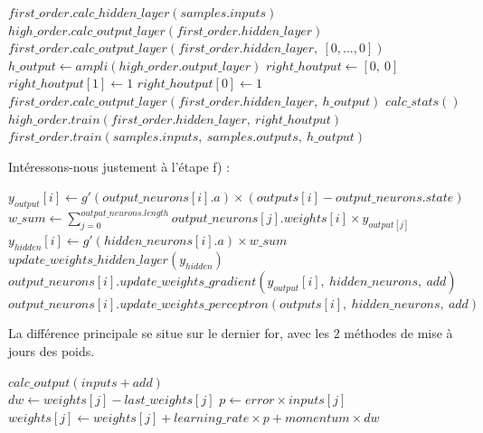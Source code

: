 \documentclass[a4paper,12pt, twoside]{article}
\begin{document}
\begin{algorithmic}

\State $first\_order.calc\_hidden\_layer(samples.inputs)$
\State $high\_order.calc\_output\_layer(first\_order.hidden\_layer)$
\State $first\_order.calc\_output\_layer(first\_order.hidden\_layer,\ [0, ..., 0])$
\State 
\State $h\_output \gets ampli(high\_order.output\_layer)$
\State $right\_houtput \gets [0,\ 0]$
  \State $right\_houtput[1] \gets 1$
\Else
  \State $right\_houtput[0] \gets 1$
\EndIf
\State $first\_order.calc\_output\_layer(first\_order.hidden\_layer,\ h\_output)$
\State
\State $calc\_stats()$
\State
\State $high\_order.train(first\_order.hidden\_layer,\ right\_houtput)$
\State $first\_order.train(samples.inputs,\ samples.outputs,\ h\_output)$
\State
\State
\end{algorithmic}
Intéressons-nous justement à l'étape f) :
\\[0.7cm]

\begin{algorithmic}

\State $y_{output}[i] \gets g'(output\_neurons[i].a) \times ( outputs[i] - output\_neurons.state )$
\EndFor
\\
\State $w\_sum \gets \sum \limits_{j=0}^{output\_neurons.length} output\_neurons[j].weights[i] \times y_{output[j]}$
\State $y_{hidden}[i] \gets g'(hidden\_neurons[i].a) \times w\_sum$
\EndFor
\State $update\_weights\_hidden\_layer(y_{hidden})$
\\
\State $output\_neurons[i].update\_weights\_gradient(y_{output}[i],\ hidden\_neurons,\ add)$
\State $output\_neurons[i].update\_weights\_perceptron(outputs[i],\ hidden\_neurons,\ add)$
\EndFor
\EndFunction
\State
\end{algorithmic}

La différence principale se situe sur le dernier for, avec les 2 méthodes de mise à jours des poids.
\\[0.7cm]

\begin{algorithmic}

\State $calc\_output(inputs + add)$
\\
\State $dw \gets weights[j] - last\_weights[j]$
\State $p \gets error \times inputs[j]$
\State $weights[j] \gets weights[j] + learning\_rate \times p + momentum \times dw$
\EndFor
\EndFunction
\State
\State
\end{algorithmic}
\end{document}
